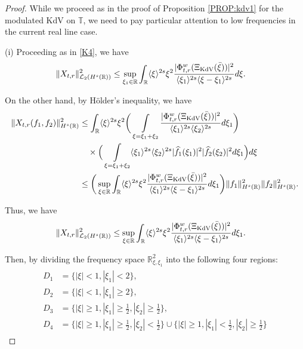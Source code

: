 \documentclass[letterpaper, 11pt,  reqno]{amsart}
\DeclareMathOperator*{\intt}{\int}
\newcommand{\1}{\hspace{0.5mm}\text{I}\hspace{0.5mm}}
\newcommand{\noi}{\noindent}
\newcommand{\R}{\mathbb{R}}
\newcommand{\T}{\mathbb{T}}
\newcommand{\ft}{\widehat}
\newcommand{\jb}[1]
{\langle #1 \rangle}
\newcommand{\cL}{\mathcal{L}}
\newcommand{\KDV}{\text{\rm KdV} }
\numberwithin{equation}{section}
\numberwithin{theorem}{section}
\begin{document}
\begin{proof}
While we proceed as in the proof of Proposition \ref{PROP:kdv1}
for the modulated KdV on $\T$, 
we need to pay particular attention to low frequencies 
in the current real line case.

\medskip

\noi
(i) 
Proceeding as in \eqref{K4}, we have 
\begin{align}
\| X_{t,r} \|_{\cL_2(H^s(\R))}^2
&\leq  
\sup_{\xi_1 \in \R}
\int_\R \jb{\xi}^{2s}
\xi^2
\frac{|\Phi^{w}_{t,r} (\Xi_\KDV(\bar \xi)) |^2}{\jb{\xi_1}^{2s}\jb{\xi - \xi_1}^{2s}} d\xi.
\label{KR0a}
\end{align}

\noi
On the other hand, by H\"older's inequality, we have 
\begin{align}
\begin{split}
\| X_{t,r} (f_1,f_2)\|_{H^s(\R)}^2
&\leq
 \int_\R \jb{\xi}^{2s}
 \xi^2
 \bigg(  \intt_{\xi = \xi_1 + \xi_2}
\frac{ |\Phi^w_{t,r} ( \Xi_\KDV(\bar \xi) )|^2 }{\jb{\xi_1}^{2 s}  \jb{\xi_2}^{2s} } d\xi_1  \bigg) \\
& \quad\times 
 \Big(\intt_{\xi = \xi_1 + \xi_2}   \jb{\xi_1}^{2 s} \jb{\xi_2}^{2s}
|\ft f_1(\xi_1)  |^2  |\ft f_2(\xi_2)  |^2  d\xi_1 \Big)  d\xi  \\
&\leq
\bigg(\sup_{\xi\in\R} 
  \int_\R 
  \jb{\xi}^{ 2s }
  \xi^2
   \frac{|\Phi^{w}_{t,r} (\Xi_\KDV(\bar \xi)) |^2}{ \jb{\xi_1}^{2s}  \jb{\xi - \xi_1}^{2s}}  d\xi_1\bigg)
   \|f_1\|_{H^s(\R)}^2
\|f_2\|_{H^s(\R)}^2.
\end{split}
\label{KR0x}
\end{align}

\noi
Thus, we have 
\begin{align}
\| X_{t,r} \|_{\cL_2(H^s(\R))}^2
&\leq  
\sup_{\xi\in\R} 
  \int_\R 
  \jb{\xi}^{ 2s}
  \xi^2
   \frac{|\Phi^{w}_{t,r} (\Xi_\KDV(\bar \xi)) |^2}{ \jb{\xi_1}^{2s}  \jb{\xi - \xi_1}^{2s}}  d\xi_1.
\label{KR0b}
\end{align}

\noi
Then, 
by dividing the frequency space $\R^2_{\xi, \xi_1}$ into the following four regions:
\begin{align}
\begin{aligned}
D_1 &=  \{| \xi |< 1, |\xi_1|< 2\} , \\
D_2 &= \{| \xi |< 1, |\xi_1|\ge 2\}, \\
D_3 &= \Big\{ | \xi |\ge 1, |\xi_1|\ge \frac12, |\xi_2|\ge \frac12  \Big\},   \\
D_4 &= 
 \Big\{   |  \xi  |\ge 1, |\xi_1|\ge \frac12, |\xi_2|< \frac12  \Big\} 
 \cup
\Big\{| \xi  |\ge 1, | \xi_1 |< \frac12, |\xi_2| \ge \frac12  \Big\}
\end{aligned}
\label{KR2b}
\end{align}



\end{proof}
\end{document}

